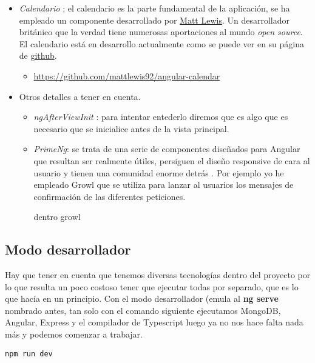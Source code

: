\begin{itemize}
\item \emph{Calendario} : el calendario es la parte fundamental de la aplicación, se ha empleado un componente desarrollado por \href{https://mattlewis.me/}{Matt Lewis}. Un desarrollador británico que la verdad tiene numerosas aportaciones al mundo \emph{open source}. El calendario está en desarrollo actualmente como se puede ver en su página de \href{https://github.com/mattlewis92/angular-calendar}{github}. 
\begin{itemize}
\item \url{https://github.com/mattlewis92/angular-calendar}
\end{itemize}



\item Otros detalles a tener en cuenta.
\begin{itemize}
\item \emph{ngAfterViewInit} \cite{afterview} : para intentar entederlo diremos que es algo que es necesario que se inicialice antes de la vista principal. 
\item \emph{PrimeNg}: se trata de una serie de componentes diseñados para Angular que resultan ser realmente útiles, persiguen el diseño responsive de cara al usuario y tienen una comunidad enorme detrás \cite{prime}. Por ejemplo yo he empleado Growl \cite{growl} que se utiliza para lanzar al usuarios los mensajes de confirmación de las diferentes peticiones.  

dentro growl 

\end{itemize}
	
\end{itemize}








\subsection{Modo desarrollador}

Hay que tener en cuenta que tenemos diversas tecnologías dentro del proyecto por lo que resulta un poco costoso tener que ejecutar todas por separado, que es lo que hacía en un principio. Con el modo desarrollador (emula al \textbf{ng serve} nombrado antes, tan solo con el comando siguiente ejecutamos MongoDB, Angular, Express y el compilador de Typescript luego ya no nos hace falta nada más y podemos comenzar a trabajar. 

	\lstset{language=C, breaklines=true, basicstyle=\footnotesize}
		\begin{lstlisting}[frame=single]
		npm run dev
    	\end{lstlisting}

